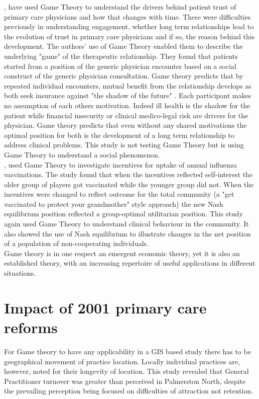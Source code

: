 \documentclass[11pt,a4paper]{article}
\begin{document}
\citet{tarrant2010continuity}, have used Game Theory to understand the drivers behind patient trust of primary care physicians and how that changes with time. There were difficulties previously in understanding engagement, whether long term relationships lead to the evolution of trust in primary care physicians and if so, the reason behind this development. The authors' use of Game Theory enabled them to describe the underlying "game" of the therapeutic relationship. They found that patients started from a position of the generic physician encounter based on a social construct of the generic physician consultation. Game theory predicts that by repeated individual encounters, mutual benefit from the relationship develops as both seek insurance against "the shadow of the future" \citep{tarrant2010continuity}. Each participant makes no assumption of each others motivation. Indeed ill health is the shadow for the patient while financial insecurity or clinical medico-legal risk  are drivers for the physician. Game theory predicts that even without any shared motivations the optimal position for both is the development of a long term relationship to address clinical problems.  This study is not testing Game Theory but is using Game Theory to understand a social phenomenon. \\

\citet{chapman2012using}, used Game Theory to investigate incentives for uptake of annual influenza vaccinations.  The study found that when the incentives reflected self-interest the older group of players got vaccinated while the younger group did not. When the incentives were changed to reflect outcome for the total community (a "get vaccinated to protect your grandmother" style approach) the new Nash equilibrium position reflected a group-optimal utilitarian position. This study again used Game Theory to understand clinical behaviour in the community. It also showed the use of Nash equilibrium to illustrate changes in the net position of a population of non-cooperating individuals. \\

Game theory is in one respect an emergent economic theory, yet it is also an established theory, with an increasing repertoire of useful applications in different situations. \\

\pagebreak

\section{Impact of 2001 primary care reforms}
For Game theory to have any applicability in a GIS based study there has to be geographical movement of practice location. Locally individual practices are, however,  noted for their longevity of location. This study revealed that General Practitioner turnover was greater than perceived in Palmerston North, despite the prevailing perception being focused on difficulties of attraction not retention. \\
\end{document}
